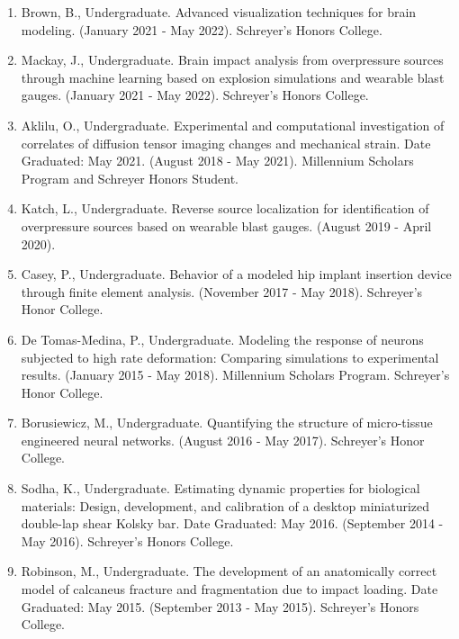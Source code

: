 \documentclass[
]{article}
\begin{document}
\begin{enumerate}
  \def\labelenumi{\arabic{enumi}.}
    \item Brown, B.,
     Undergraduate. Advanced visualization techniques for brain modeling. (January 2021 - May 2022). Schreyer's Honors College.
    \item Mackay, J.,
     Undergraduate. Brain impact analysis from overpressure sources through machine learning based on explosion simulations and wearable blast gauges. (January 2021 - May 2022). Schreyer's Honors College.
    \item Aklilu, O.,
     Undergraduate. Experimental and computational investigation of correlates of diffusion tensor imaging changes and mechanical strain. Date Graduated: May 2021. (August 2018 - May 2021). Millennium Scholars Program and Schreyer Honors Student.
    \item Katch, L.,
     Undergraduate. Reverse source localization for identification of overpressure sources based on wearable blast gauges. (August 2019 - April 2020).
    \item Casey, P.,
     Undergraduate. Behavior of a modeled hip implant insertion device through finite element analysis. (November 2017 - May 2018). Schreyer's Honor College.
    \item De Tomas-Medina, P.,
     Undergraduate. Modeling the response of neurons subjected to high rate deformation: Comparing simulations to experimental results. (January 2015 - May 2018). Millennium Scholars Program. Schreyer's Honor College.
    \item Borusiewicz, M.,
     Undergraduate. Quantifying the structure of micro-tissue engineered neural networks. (August 2016 - May 2017). Schreyer's Honor College.
    \item Sodha, K.,
     Undergraduate. Estimating dynamic properties for biological materials: Design, development, and calibration of a desktop miniaturized double-lap shear Kolsky bar. Date Graduated: May 2016. (September 2014 - May 2016). Schreyer's Honors College.
    \item Robinson, M.,
     Undergraduate. The development of an anatomically correct model of calcaneus fracture and fragmentation due to impact loading. Date Graduated: May 2015. (September 2013 - May 2015). Schreyer's Honors College.
\end{enumerate}
\end{document}

